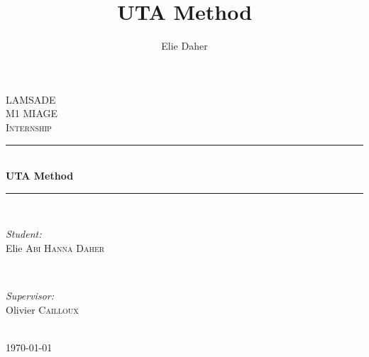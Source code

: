 \documentclass{report}
\title{UTA Method}
\author{Elie Daher}
\begin{document}

\begin{titlepage}

\newcommand{\HRule}{\rule{\linewidth}{0.5mm}}
\center

\textsc{\LARGE LAMSADE}\\[1.5cm] 
\textsc{\Large M1 MIAGE}\\[0.5cm]
\textsc{\large Internship}\\[0.5cm] 

\HRule \\[0.4cm]
{ \huge \bfseries UTA Method} 
\HRule \\[1.5cm]

\begin{minipage}{0.4\textwidth}
\begin{flushleft} \large
\emph{Student:}\\
Elie \textsc{Abi Hanna Daher}
\end{flushleft}
\end{minipage}
~
\begin{minipage}{0.4\textwidth}
\begin{flushright} \large
\emph{Supervisor:} \\
Olivier \textsc{Cailloux} \\
\end{flushright}
\end{minipage}\\[2cm]

{\large \today}\\[2cm]

\begin{figure}[h]
\\[0.5cm]
\end{figure}

\vfill

\end{titlepage}
\end{document}
